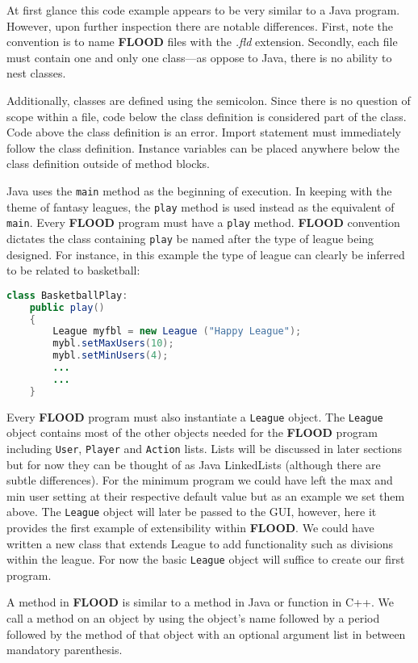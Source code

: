 \documentclass[12pt]{report}
\begin{document}
\begin{doublespace}
At first glance this code example appears to be very similar to a Java program. However, upon further inspection there are notable differences. First, note the convention is to name \textbf{FLOOD} files with the \textit{.fld} extension. Secondly, each file must contain one and only one class---as oppose to Java, there is no ability to nest classes.

Additionally, classes are defined using the semicolon. Since there is no question of scope within a file, code below the class definition is considered part of the class. Code above the class definition is an error. Import statement must immediately follow the class definition. Instance variables can be placed anywhere below the class definition outside of method blocks.

Java uses the \texttt{main} method as the beginning of execution. In keeping with the theme of fantasy leagues, the \texttt{play} method is used instead as the equivalent of \texttt{main}. Every \textbf{FLOOD} program must have a \texttt{play} method. \textbf{FLOOD} convention dictates the class containing \texttt{play} be named after the type of league being designed. For instance, in this example the type of league can clearly be inferred to be related to basketball:
\end{doublespace}

\begin{lstlisting}[language=Java,label=some-code,caption=BasketballPlay.fld]
class BasketballPlay:
	public play()
	{
		League myfbl = new League ("Happy League");
		mybl.setMaxUsers(10);
		mybl.setMinUsers(4);
		...
		...
	}
\end{lstlisting}

\begin{doublespace}
Every \textbf{FLOOD} program must also instantiate a \texttt{League} object. The \texttt{League} object contains most of the other objects needed for the \textbf{FLOOD} program including \texttt{User}, \texttt{Player} and \texttt{Action} lists. Lists will be discussed in later sections but for now they can be thought of as Java LinkedLists (although there are subtle differences). For the minimum program we could have left the max and min user setting at their respective default value but as an example we set them above. The \texttt{League} object will later be passed to the GUI, however, here it provides the first example of extensibility within \textbf{FLOOD}. We could have written a new class that extends League to add functionality such as divisions within the league. For now the basic \texttt{League} object will suffice to create our first program.

A method in \textbf{FLOOD} is similar to a method in Java or function in C++. We call a method on an object by using the object's name followed by a period followed by the method of that object with an optional argument list in between mandatory parenthesis.
\end{doublespace}
\end{document}
